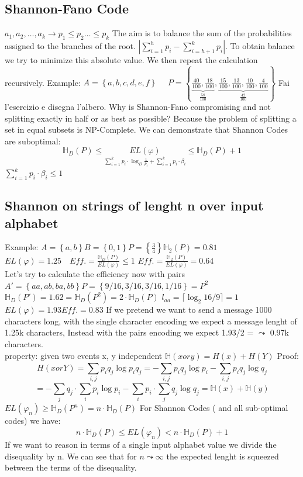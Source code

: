     \subsection*{Shannon-Fano Code}
    $a_1, a_2, \ldots, a_k \longrightarrow p_1\leq p_2\ldots \leq p_k$ The aim is to balance the sum of the probabilities assigned to the branches of the root.
    $|\sum_{i=1}^{h}{p_i}- \sum_{i=h+1}^{k}{p_i}|$. To obtain balance we try to minimize this absolute value. We then repeat the calculation recursively.
    Example: 
    $A= \left\{ a,b,c,d,e,f \right\}$ 
    $\quad P=\left\{ \underbrace{\frac{40}{100}, \frac{18}{100}}_{\frac{58}{100}}, \underbrace{\frac{15}{100}, \frac{13}{100}, \frac{10}{100}, \frac{4}{100}}_{\frac{42}{100}} \right\}$
    Fai l'esercizio e disegna l'albero.
    Why is Shannon-Fano compromising and not splitting exactly in half or as best as possible? Because the problem of splitting a set in equal
    subsets is NP-Complete.\newline
    We can demonstrate that Shannon Codes are suboptimal:
    $$\mathbb{H}_D(P) \leq \underset{\sum_{i=1}^{k}{p_i \cdot \log_{D}{\frac{1}{p_i}}}+\sum_{i=1}^{k}{p_i\cdot\beta_i}}{EL(\varphi)} \leq \mathbb{H}_D(P)+1$$
    $\sum_{i=1}^{k}{p_i\cdot\beta_i} \leq1$
    \subsection*{Shannon on strings of lenght n over input alphabet}
    Example: $A=\left\{ a,b \right\} B=\left\{ 0,1 \right\} P=\left\{ \frac{3}{4} \right\} \mathbb{H}_2(P)=0.81$
    $EL(\varphi) = 1.25 \quad Eff. = \frac{\mathbb{H}_D(P)}{EL(\varphi)}\leq 1$
    $Eff. = \frac{\mathbb{H}_2(P)}{EL(\varphi)}=0.64$\\
    Let's try to calculate the efficiency now with pairs
    $A'=\left\{ aa, ab,ba,bb \right\} P=\left\{ 9/16, 3/16, 3/16, 1/16 \right\} = P^2$ $
    \mathbb{H}_D(P')= 1.62 = \mathbb{H}_D(P^2) = 2\cdot \mathbb{H}_D(P)$
    $l_{aa} = \lceil  \log_2{16/9} \rceil= 1$
    $EL(\varphi) = 1.93 Eff. = 0.83$
    If we pretend we want to send a message 1000 characters long, with the single character encoding we expect a message lenght of 1.25k characters,
    Instead with the pairs encoding we expect 1.93/2 = $\leadsto$ 0.97k characters.\\
    property: given two events x, y independent
    $\mathbb{H}(x or y) = H(x) + H(Y)$
    Proof:
    $$H(x or Y ) = \sum_{i,j}^{}{p_i q_j \log{p_iq_j}} = - \sum_{i,j}^{}{p_i q_j \log{p_i}} - \sum_{i,j}^{}{p_i q_j \log{q_j}}$$
    $$ = -\sum_{j}{q_j} \cdot \sum_{i}^{}{p_i \log{p_i}} - \sum_{i}{p_i} \cdot \sum_{j}{q_j \log{q_j}} = \mathbb{H}(x) + \mathbb{H}(y)$$
    $EL(\varphi_n) \geq \mathbb{H}_D(P^n) = n\cdot \mathbb{H}_D(P)$
    For Shannon Codes ( and all sub-optimal codes) we have:
    $$ n\cdot \mathbb{H}_D(P) \leq EL(\varphi_n) < n\cdot \mathbb{H}_D(P)+1$$ If we want to reason in terms of a single input alphabet value
    we divide the disequality by n. We can see that for $n \leadsto \infty $ the expected lenght is squeezed between the terms of the disequality.
